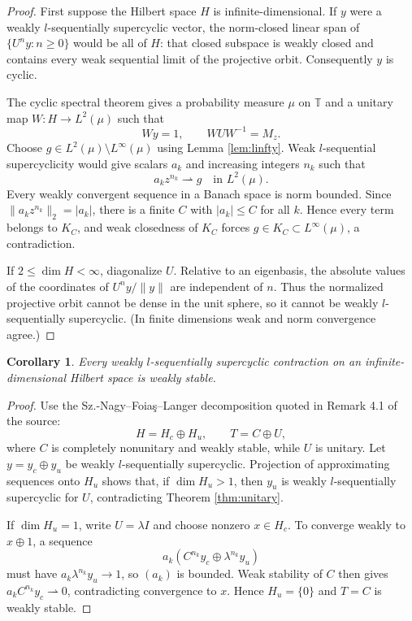 \documentclass[10pt]{article}
\newtheorem{corollary}{Corollary}
\newcommand{\T}{\mathbb T}
\begin{document}
\begin{proof}
First suppose the Hilbert space $H$ is infinite-dimensional.  If $y$ were a
weakly $l$-sequentially supercyclic vector, the norm-closed linear span of
$\{U^ny:n\ge0\}$ would be all of $H$: that closed subspace is weakly closed
and contains every weak sequential limit of the projective orbit.
Consequently $y$ is cyclic.

The cyclic spectral theorem gives a probability measure $\mu$ on $\T$ and a
unitary map $W:H\to L^2(\mu)$ such that
\[
 Wy=1,\qquad WUW^{-1}=M_z.
\]
Choose $g\in L^2(\mu)\setminus L^\infty(\mu)$ using Lemma
\ref{lem:linfty}.  Weak $l$-sequential supercyclicity would give scalars
$a_k$ and increasing integers $n_k$ such that
\[
 a_kz^{n_k}\rightharpoonup g\quad\text{in }L^2(\mu).
\]
Every weakly convergent sequence in a Banach space is norm bounded.  Since
$\|a_kz^{n_k}\|_2=|a_k|$, there is a finite $C$ with $|a_k|\le C$ for all
$k$.  Hence every term belongs to $K_C$, and weak closedness of $K_C$ forces
$g\in K_C\subset L^\infty(\mu)$, a contradiction.

If $2\le\dim H<\infty$, diagonalize $U$.  Relative to an eigenbasis, the
absolute values of the coordinates of $U^ny/\|y\|$ are independent of $n$.
Thus the normalized projective orbit cannot be dense in the unit sphere, so
it cannot be weakly $l$-sequentially supercyclic.  (In finite dimensions weak
and norm convergence agree.)
\end{proof}

\begin{corollary}\label{cor:contraction}
Every weakly $l$-sequentially supercyclic contraction on an
infinite-dimensional Hilbert space is weakly stable.
\end{corollary}

\begin{proof}
Use the Sz.-Nagy--Foia\c{s}--Langer decomposition quoted in Remark 4.1 of the
source:
\[
 H=H_c\oplus H_u,\qquad T=C\oplus U,
\]
where $C$ is completely nonunitary and weakly stable, while $U$ is unitary.
Let $y=y_c\oplus y_u$ be weakly $l$-sequentially supercyclic.  Projection of
approximating sequences onto $H_u$ shows that, if $\dim H_u>1$, then $y_u$
is weakly $l$-sequentially supercyclic for $U$, contradicting Theorem
\ref{thm:unitary}.

If $\dim H_u=1$, write $U=\lambda I$ and choose nonzero $x\in H_c$.  To
converge weakly to $x\oplus1$, a sequence
\[
 a_k(C^{n_k}y_c\oplus \lambda^{n_k}y_u)
\]
must have $a_k\lambda^{n_k}y_u\to1$, so $(a_k)$ is bounded.  Weak stability
of $C$ then gives $a_kC^{n_k}y_c\rightharpoonup0$, contradicting convergence
to $x$.  Hence $H_u=\{0\}$ and $T=C$ is weakly stable.
\end{proof}
\end{document}
